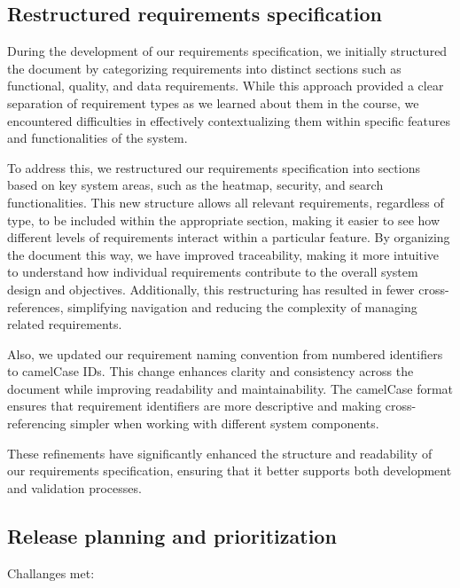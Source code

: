 \subsection{Restructured requirements specification}
During the development of our requirements specification, we initially structured the document by categorizing requirements into distinct sections such as functional, quality, and data requirements. While this approach provided a clear separation of requirement types as we learned about them in the course, we encountered difficulties in effectively contextualizing them within specific features and functionalities of the system.

To address this, we restructured our requirements specification into sections based on key system areas, such as the heatmap, security, and search functionalities. This new structure allows all relevant requirements, regardless of type, to be included within the appropriate section, making it easier to see how different levels of requirements interact within a particular feature. By organizing the document this way, we have improved traceability, making it more intuitive to understand how individual requirements contribute to the overall system design and objectives. Additionally, this restructuring has resulted in fewer cross-references, simplifying navigation and reducing the complexity of managing related requirements.

Also, we updated our requirement naming convention from numbered identifiers to camelCase IDs. This change enhances clarity and consistency across the document while improving readability and maintainability. The camelCase format ensures that requirement identifiers are more descriptive and making cross-referencing simpler when working with different system components.

These refinements have significantly enhanced the structure and readability of our requirements specification, ensuring that it better supports both development and validation processes.

\subsection{Release planning and prioritization}
Challanges met:

